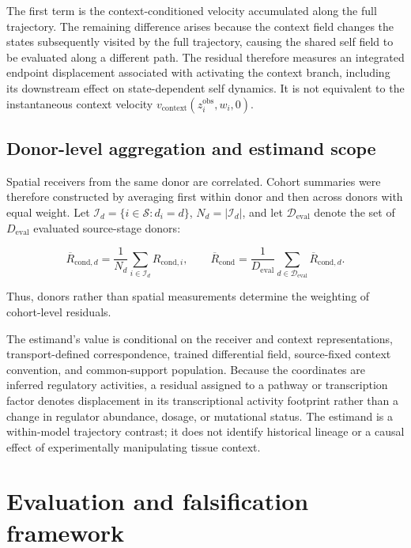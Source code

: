 The first term is the context-conditioned velocity accumulated along the full
trajectory. The remaining difference arises because the context field changes
the states subsequently visited by the full trajectory, causing the shared self
field to be evaluated along a different path. The residual therefore measures
an integrated endpoint displacement associated with activating the context
branch, including its downstream effect on state-dependent self dynamics. It is
not equivalent to the instantaneous context velocity
\(v_{\mathrm{context}}(z_i^{\mathrm{obs}},w_i,0)\).

\subsection{Donor-level aggregation and estimand scope}
\label{sec:methods-estimand-donor-aggregation}
\label{sec:methods-estimand-scope}

Spatial receivers from the same donor are correlated. Cohort summaries were therefore constructed by averaging first within donor and then across donors with equal weight. Let
\(\mathcal{I}_d=\{i\in\mathcal{S}:d_i=d\}\),
\(N_d=|\mathcal{I}_d|\), and let
\(\mathcal{D}_{\mathrm{eval}}\) denote the set of
\(D_{\mathrm{eval}}\) evaluated source-stage donors:

\begin{equation}
\overline{R}_{\mathrm{cond},d}
=
\frac{1}{N_d}
\sum_{i\in\mathcal{I}_d}
R_{\mathrm{cond},i},
\qquad
\overline{R}_{\mathrm{cond}}
=
\frac{1}{D_{\mathrm{eval}}}
\sum_{d\in\mathcal{D}_{\mathrm{eval}}}
\overline{R}_{\mathrm{cond},d}.
\label{eq:methods-rcond-aggregation}
\end{equation}

Thus, donors rather than spatial measurements determine the weighting of cohort-level residuals.

The estimand's value is conditional on the receiver and context representations, transport-defined correspondence, trained differential field, source-fixed context convention, and
common-support population. Because the coordinates are inferred regulatory activities, a residual assigned to a pathway or transcription factor denotes displacement in its transcriptional activity footprint rather than a change in regulator abundance,  dosage, or mutational status. The estimand is a within-model trajectory contrast; it does not identify historical lineage or a causal effect of experimentally manipulating tissue context.

\section{Evaluation and falsification framework}
\label{sec:methods-evaluation}
\label{sec:hypotheses}


